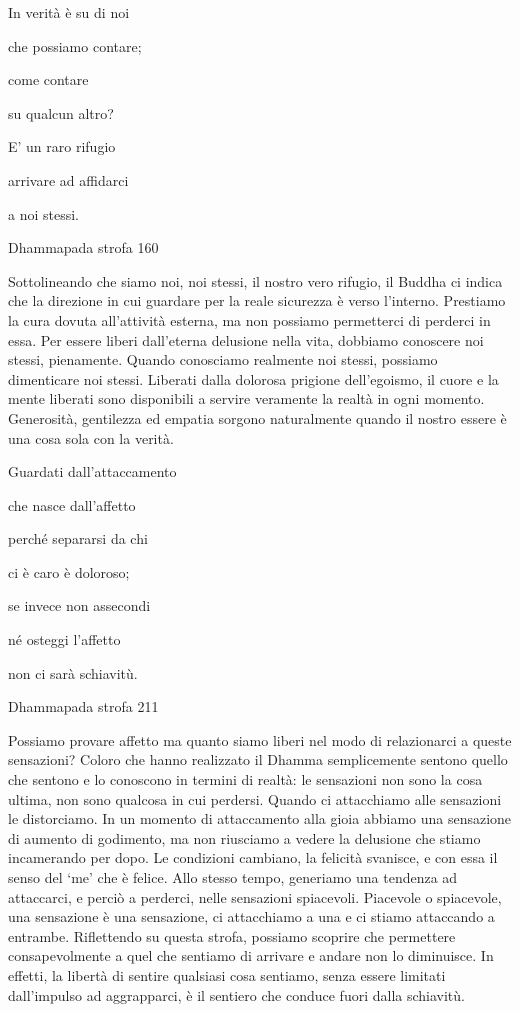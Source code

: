 \documentclass[a4paper,portrait,12pt]{article}
\begin{document}
In verit\`{a} \`{e} su di noi


che possiamo contare;


come contare	


su qualcun altro?


E' un raro rifugio


arrivare ad affidarci


a noi stessi.





Dhammapada strofa 160


\newpage



Sottolineando che siamo noi, noi stessi, il nostro vero rifugio, il Buddha ci indica che la direzione in cui guardare per la reale sicurezza \`{e} verso l'interno. Prestiamo la cura dovuta all'attivit\`{a} esterna, ma non possiamo permetterci di perderci in essa. Per essere liberi dall'eterna delusione nella vita, dobbiamo conoscere noi stessi, pienamente. Quando conosciamo realmente noi stessi, possiamo dimenticare noi stessi. Liberati dalla dolorosa prigione dell'egoismo, il cuore e la mente liberati sono disponibili a servire veramente la realt\`{a} in ogni momento. Generosit\`{a}, gentilezza ed empatia sorgono naturalmente quando il nostro essere \`{e} una cosa sola con la verit\`{a}.


\newpage



Guardati dall'attaccamento


che nasce dall'affetto


perch\'{e} separarsi da chi 


ci \`{e} caro \`{e} doloroso;


se invece non assecondi


n\'{e} osteggi l'affetto


non ci sar\`{a} schiavitù.





Dhammapada strofa 211


\newpage



Possiamo provare affetto ma quanto siamo liberi nel modo di relazionarci a queste sensazioni? Coloro che hanno realizzato il Dhamma semplicemente sentono quello che sentono e lo conoscono in termini di realt\`{a}: le sensazioni non sono la cosa ultima, non sono qualcosa in cui perdersi. Quando ci attacchiamo alle sensazioni le distorciamo. In un momento di attaccamento alla gioia abbiamo una sensazione di aumento di godimento, ma non riusciamo a vedere la delusione che stiamo incamerando per dopo. Le condizioni cambiano, la felicit\`{a} svanisce, e con essa il senso del `me' che \`{e} felice. Allo stesso tempo, generiamo una tendenza ad attaccarci, e perci\`{o} a perderci, nelle sensazioni spiacevoli. Piacevole o spiacevole, una sensazione \`{e} una sensazione, ci attacchiamo a una e ci stiamo attaccando a entrambe. Riflettendo su questa strofa, possiamo scoprire che permettere consapevolmente a quel che sentiamo di arrivare e andare non lo diminuisce. In effetti, la libert\`{a} di sentire qualsiasi cosa sentiamo, senza essere limitati dall'impulso ad aggrapparci, \`{e} il sentiero che conduce fuori dalla schiavitù.
\end{document}
